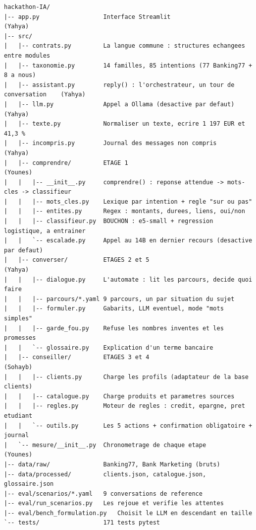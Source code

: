 \documentclass[11pt,a4paper]{article}
\begin{document}
\begin{code}
\footnotesize
\begin{verbatim}
hackathon-IA/
|-- app.py                  Interface Streamlit                                   (Yahya)
|-- src/
|   |-- contrats.py         La langue commune : structures echangees entre modules
|   |-- taxonomie.py        14 familles, 85 intentions (77 Banking77 + 8 a nous)
|   |-- assistant.py        reply() : l'orchestrateur, un tour de conversation    (Yahya)
|   |-- llm.py              Appel a Ollama (desactive par defaut)                 (Yahya)
|   |-- texte.py            Normaliser un texte, ecrire 1 197 EUR et 41,3 %
|   |-- incompris.py        Journal des messages non compris                      (Yahya)
|   |-- comprendre/         ETAGE 1                                               (Younes)
|   |   |-- __init__.py     comprendre() : reponse attendue -> mots-cles -> classifieur
|   |   |-- mots_cles.py    Lexique par intention + regle "sur ou pas"
|   |   |-- entites.py      Regex : montants, durees, liens, oui/non
|   |   |-- classifieur.py  BOUCHON : e5-small + regression logistique, a entrainer
|   |   `-- escalade.py     Appel au 14B en dernier recours (desactive par defaut)
|   |-- converser/          ETAGES 2 et 5                                         (Yahya)
|   |   |-- dialogue.py     L'automate : lit les parcours, decide quoi faire
|   |   |-- parcours/*.yaml 9 parcours, un par situation du sujet
|   |   |-- formuler.py     Gabarits, LLM eventuel, mode "mots simples"
|   |   |-- garde_fou.py    Refuse les nombres inventes et les promesses
|   |   `-- glossaire.py    Explication d'un terme bancaire
|   |-- conseiller/         ETAGES 3 et 4                                         (Sohayb)
|   |   |-- clients.py      Charge les profils (adaptateur de la base clients)
|   |   |-- catalogue.py    Charge produits et parametres sources
|   |   |-- regles.py       Moteur de regles : credit, epargne, pret etudiant
|   |   `-- outils.py       Les 5 actions + confirmation obligatoire + journal
|   `-- mesure/__init__.py  Chronometrage de chaque etape                        (Younes)
|-- data/raw/               Banking77, Bank Marketing (bruts)
|-- data/processed/         clients.json, catalogue.json, glossaire.json
|-- eval/scenarios/*.yaml   9 conversations de reference
|-- eval/run_scenarios.py   Les rejoue et verifie les attentes
|-- eval/bench_formulation.py   Choisit le LLM en descendant en taille
`-- tests/                  171 tests pytest
\end{verbatim}
\end{code}
\end{document}
